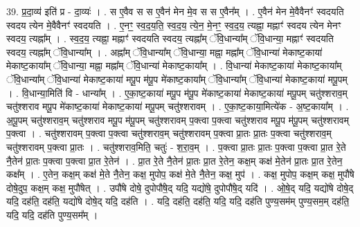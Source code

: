 \documentclass[17pt]{extarticle}
\begin{document}
39. प्र॒दा॒व्य॑ इति॑ प्र - दा॒व्यः॑ । . स ए॒वैव स स ए॒वैन॑ मेन मे॒व स स ए॒वैन᳚म् । . ए॒वैन॑ मेन मे॒वैवैनꣳ॑ स्वदयति स्वदय त्येन मे॒वैवैनꣳ॑ स्वदयति । . ए॒नꣳ॒॒ स्व॒द॒य॒ति॒ स्व॒द॒य॒ त्ये॒न॒ मे॒नꣳ॒॒ स्व॒द॒य॒ त्यह्ना॒ मह्नाꣳ॑ स्वदय त्येन मेनꣳ स्वदय॒ त्यह्ना᳚म् । . स्व॒द॒य॒ त्यह्ना॒ मह्नाꣳ॑ स्वदयति स्वदय॒ त्यह्ना᳚म् ॅवि॒धान्या᳚म् ॅवि॒धान्या॒ मह्नाꣳ॑ स्वदयति स्वदय॒ त्यह्ना᳚म् ॅवि॒धान्या᳚म् । . अह्ना᳚म् ॅवि॒धान्या᳚म् ॅवि॒धान्या॒ मह्ना॒ मह्ना᳚म् ॅवि॒धान्या॑ मेकाष्ट॒काया॑ मेकाष्ट॒काया᳚म् ॅवि॒धान्या॒ मह्ना॒ मह्ना᳚म् ॅवि॒धान्या॑ मेकाष्ट॒काया᳚म् । . वि॒धान्या॑ मेकाष्ट॒काया॑ मेकाष्ट॒काया᳚म् ॅवि॒धान्या᳚म् ॅवि॒धान्या॑ मेकाष्ट॒काया॑ मपू॒प म॑पू॒प मे॑काष्ट॒काया᳚म् ॅवि॒धान्या᳚म् ॅवि॒धान्या॑ मेकाष्ट॒काया॑ मपू॒पम् । . वि॒धान्या॒मिति॑ वि - धान्या᳚म् । . ए॒का॒ष्ट॒काया॑ मपू॒प म॑पू॒प मे॑काष्ट॒काया॑ मेकाष्ट॒काया॑ मपू॒पम् चतु॑श्शराव॒म् चतु॑श्शराव मपू॒प मे॑काष्ट॒काया॑ मेकाष्ट॒काया॑ मपू॒पम् चतु॑श्शरावम् । . ए॒का॒ष्ट॒काया॒मित्ये॑क - अ॒ष्ट॒काया᳚म् । . अ॒पू॒पम् चतु॑श्शराव॒म् चतु॑श्शराव मपू॒प म॑पू॒पम् चतु॑श्शरावम् प॒क्त्वा प॒क्त्वा चतु॑श्शराव मपू॒प म॑पू॒पम् चतु॑श्शरावम् प॒क्त्वा । . चतु॑श्शरावम् प॒क्त्वा प॒क्त्वा चतु॑श्शराव॒म् चतु॑श्शरावम् प॒क्त्वा प्रा॒तः प्रा॒तः प॒क्त्वा चतु॑श्शराव॒म् चतु॑श्शरावम् प॒क्त्वा प्रा॒तः । . चतु॑श्शराव॒मिति॒ चतुः॑ - श॒रा॒व॒म् । . प॒क्त्वा प्रा॒तः प्रा॒तः प॒क्त्वा प॒क्त्वा प्रा॒त रे॒ते नै॒तेन॑ प्रा॒तः प॒क्त्वा प॒क्त्वा प्रा॒त रे॒तेन॑ । . प्रा॒त रे॒ते नै॒तेन॑ प्रा॒तः प्रा॒त रे॒तेन॒ कक्ष॒म् कक्ष॑ मे॒तेन॑ प्रा॒तः प्रा॒त रे॒तेन॒ कक्ष᳚म् । . ए॒तेन॒ कक्ष॒म् कक्ष॑ मे॒ते नै॒तेन॒ कक्ष॒ मुपोप॒ कक्ष॑ मे॒ते नै॒तेन॒ कक्ष॒ मुप॑ । . कक्ष॒ मुपोप॒ कक्ष॒म् कक्ष॒ मुपौ॑षे दोषे॒दुप॒ कक्ष॒म् कक्ष॒ मुपौ॑षेत् । . उपौ॑षे दोषे॒ दुपोपौ॑षे॒द् यदि॒ यद्यो॑षे॒ दुपोपौ॑षे॒द् यदि॑ । . ओ॒षे॒द् यदि॒ यद्यो॑षे दोषे॒द् यदि॒ दह॑ति॒ दह॑ति॒ यद्यो॑षे दोषे॒द् यदि॒ दह॑ति । . यदि॒ दह॑ति॒ दह॑ति॒ यदि॒ यदि॒ दह॑ति पुण्य॒सम॑म् पुण्य॒सम॒म् दह॑ति॒ यदि॒ यदि॒ दह॑ति पुण्य॒सम᳚म् । \newline
\pagebreak
{}
\end{document}
